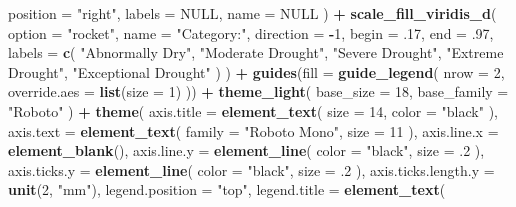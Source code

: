 \documentclass[
]{book}
\newenvironment{Shaded}{\begin{snugshade}}{\end{snugshade}}
\newcommand{\AttributeTok}[1]{\textcolor[rgb]{0.13,0.29,0.53}{#1}}
\newcommand{\ConstantTok}[1]{\textcolor[rgb]{0.56,0.35,0.01}{#1}}
\newcommand{\DecValTok}[1]{\textcolor[rgb]{0.00,0.00,0.81}{#1}}
\newcommand{\FunctionTok}[1]{\textcolor[rgb]{0.13,0.29,0.53}{\textbf{#1}}}
\newcommand{\NormalTok}[1]{#1}
\newcommand{\SpecialCharTok}[1]{\textcolor[rgb]{0.81,0.36,0.00}{\textbf{#1}}}
\newcommand{\StringTok}[1]{\textcolor[rgb]{0.31,0.60,0.02}{#1}}
\begin{document}
\begin{Shaded}
\begin{Highlighting}[]
    \AttributeTok{position =} \StringTok{"right"}\NormalTok{,}
    \AttributeTok{labels =} \ConstantTok{NULL}\NormalTok{,}
    \AttributeTok{name =} \ConstantTok{NULL}
\NormalTok{  ) }\SpecialCharTok{+}
  \FunctionTok{scale\_fill\_viridis\_d}\NormalTok{(}
    \AttributeTok{option =} \StringTok{"rocket"}\NormalTok{,}
    \AttributeTok{name =} \StringTok{"Category:"}\NormalTok{,}
    \AttributeTok{direction =} \SpecialCharTok{{-}}\DecValTok{1}\NormalTok{,}
    \AttributeTok{begin =}\NormalTok{ .}\DecValTok{17}\NormalTok{,}
    \AttributeTok{end =}\NormalTok{ .}\DecValTok{97}\NormalTok{,}
    \AttributeTok{labels =} \FunctionTok{c}\NormalTok{(}
      \StringTok{"Abnormally Dry"}\NormalTok{,}
      \StringTok{"Moderate Drought"}\NormalTok{,}
      \StringTok{"Severe Drought"}\NormalTok{,}
      \StringTok{"Extreme Drought"}\NormalTok{,}
      \StringTok{"Exceptional Drought"}
\NormalTok{    )}
\NormalTok{  ) }\SpecialCharTok{+}
  \FunctionTok{guides}\NormalTok{(}\AttributeTok{fill =} \FunctionTok{guide\_legend}\NormalTok{(}
    \AttributeTok{nrow =} \DecValTok{2}\NormalTok{,}
    \AttributeTok{override.aes =} \FunctionTok{list}\NormalTok{(}\AttributeTok{size =} \DecValTok{1}\NormalTok{)}
\NormalTok{  )) }\SpecialCharTok{+}
  \FunctionTok{theme\_light}\NormalTok{(}
    \AttributeTok{base\_size =} \DecValTok{18}\NormalTok{,}
    \AttributeTok{base\_family =} \StringTok{"Roboto"}
\NormalTok{  ) }\SpecialCharTok{+}
  \FunctionTok{theme}\NormalTok{(}
    \AttributeTok{axis.title =} \FunctionTok{element\_text}\NormalTok{(}
      \AttributeTok{size =} \DecValTok{14}\NormalTok{,}
      \AttributeTok{color =} \StringTok{"black"}
\NormalTok{    ),}
    \AttributeTok{axis.text =} \FunctionTok{element\_text}\NormalTok{(}
      \AttributeTok{family =} \StringTok{"Roboto Mono"}\NormalTok{,}
      \AttributeTok{size =} \DecValTok{11}
\NormalTok{    ),}
    \AttributeTok{axis.line.x =} \FunctionTok{element\_blank}\NormalTok{(),}
    \AttributeTok{axis.line.y =} \FunctionTok{element\_line}\NormalTok{(}
      \AttributeTok{color =} \StringTok{"black"}\NormalTok{,}
      \AttributeTok{size =}\NormalTok{ .}\DecValTok{2}
\NormalTok{    ),}
    \AttributeTok{axis.ticks.y =} \FunctionTok{element\_line}\NormalTok{(}
      \AttributeTok{color =} \StringTok{"black"}\NormalTok{,}
      \AttributeTok{size =}\NormalTok{ .}\DecValTok{2}
\NormalTok{    ),}
    \AttributeTok{axis.ticks.length.y =} \FunctionTok{unit}\NormalTok{(}\DecValTok{2}\NormalTok{, }\StringTok{"mm"}\NormalTok{),}
    \AttributeTok{legend.position =} \StringTok{"top"}\NormalTok{,}
    \AttributeTok{legend.title =} \FunctionTok{element\_text}\NormalTok{(}

\end{Highlighting}
\end{Shaded}
\end{document}
